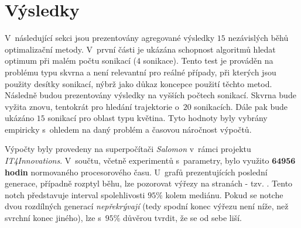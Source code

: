 	

\section{Výsledky}
V~následující sekci jsou prezentovány agregované výsledky $15$ nezávislých běhů optimalizační metody. V~první části je ukázána schopnost algoritmů hledat optimum při malém počtu sonikací ($4$ sonikace). Tento test je prováděn na problému typu skvrna a není relevantní pro reálné případy, při kterých jsou použity desítky sonikací, nýbrž jako důkaz koncepce použití těchto metod.
Následně budou prezentovány výsledky na vyšších počtech sonikací. Skvrna bude vyžita znovu, tentokrát pro hledání trajektorie o~$20$ sonikacích. Dále pak bude ukázáno $15$ sonikací pro oblast typu květina. Tyto hodnoty byly vybrány empiricky s~ohledem na daný problém a časovou náročnost výpočtů.

Výpočty byly provedeny na superpočítači \emph{Salomon} v~rámci projektu \emph{IT4Innovations}. V~součtu, včetně experimentů s~parametry, bylo využito $\textbf{64956}$ \textbf{hodin} normovaného procesorového času. U~grafů prezentujících poslední generace, případně rozptyl běhu, lze pozorovat výřezy na stranách - tzv. . Tento notch představuje interval spolehlivosti $95\%$ kolem mediánu. Pokud se notche dvou rozdílných generací \textit{nepřekrývají} (tedy spodní konec výřezu není níže, než svrchní konec jiného), lze s~$95\%$ důvěrou tvrdit, že se od sebe liší.

